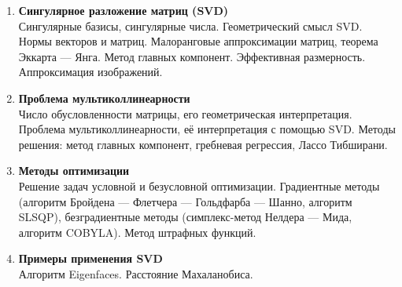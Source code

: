 \documentclass[12pt,oneside,openany]{article}
\begin{document}
\begin{enumerate}
  \item \textbf{Сингулярное разложение матриц (SVD)} \\
  Сингулярные базисы, сингулярные числа. Геометрический смысл SVD. Нормы векторов и матриц. Малоранговые аппроксимации матриц, теорема Эккарта --- Янга. Метод главных компонент. Эффективная размерность. Аппроксимация изображений.

  \item \textbf{Проблема мультиколлинеарности} \\
  Число обусловленности матрицы, его геометрическая интерпретация. Проблема мультиколлинеарности, её интерпретация с помощью SVD. Методы решения: метод главных компонент, гребневая регрессия, Лассо Тибширани.

  \item \textbf{Методы оптимизации} \\
  Решение задач условной и безусловной оптимизации. Градиентные методы (алгоритм Бройдена --- Флетчера --- Гольдфарба --- Шанно, алгоритм SLSQP), безградиентные методы (симплекс-метод Нелдера --- Мида, алгоритм COBYLA). Метод штрафных функций.
  
  \item \textbf{Примеры применения SVD} \\
  Алгоритм Eigenfaces. Расстояние Махаланобиса.

\end{enumerate}
\end{document}
